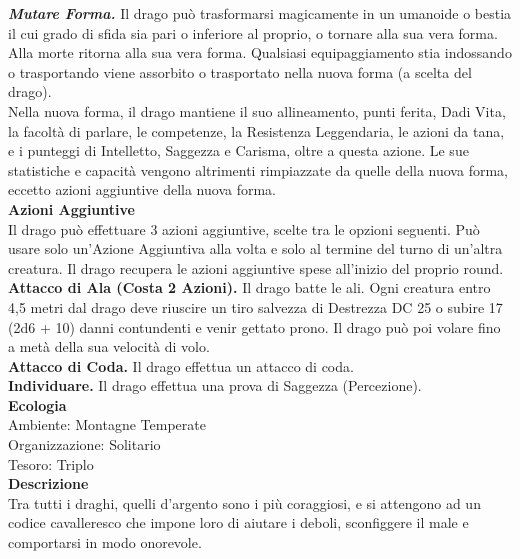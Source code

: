 \begin{multicols}{2}
\emph{\textbf{Mutare Forma.}} Il drago può trasformarsi magicamente in un umanoide o bestia il cui grado di sfida sia pari o inferiore al proprio,  o tornare alla sua vera forma. Alla morte ritorna alla sua vera forma.  Qualsiasi equipaggiamento stia indossando o trasportando viene  assorbito o trasportato nella nuova forma (a scelta del drago).  \\
Nella nuova forma, il drago mantiene il suo allineamento, punti  ferita, Dadi Vita, la facoltà di parlare, le competenze, la Resistenza  Leggendaria, le azioni da tana, e i punteggi di Intelletto, Saggezza  e Carisma, oltre a questa azione. Le sue statistiche e capacità  vengono altrimenti rimpiazzate da quelle della nuova forma, eccetto azioni aggiuntive della nuova forma.\\
\textbf{Azioni Aggiuntive}\\
Il drago può effettuare 3 azioni aggiuntive, scelte tra le opzioni  seguenti. Può usare solo un'Azione Aggiuntiva alla volta e solo  al termine del turno di un'altra creatura. Il drago recupera le azioni aggiuntive spese all'inizio del proprio round.\\
\textbf{Attacco di Ala (Costa 2 Azioni).} Il drago batte le ali. Ogni creatura entro 4,5 metri dal drago deve riuscire un tiro salvezza di Destrezza DC 25 o subire 17 (2d6 + 10) danni contundenti e  venir gettato prono. Il drago può poi volare fino a metà della sua velocità di volo.\\
\textbf{Attacco di Coda.} Il drago effettua un attacco di coda.\\
\textbf{Individuare.} Il drago effettua una prova di Saggezza (Percezione).\\
\textbf{Ecologia}\\
Ambiente: Montagne Temperate\\
Organizzazione: Solitario\\
Tesoro: Triplo\\
\textbf{Descrizione}\\
Tra tutti i draghi, quelli d’argento sono i più coraggiosi, e si attengono ad un codice cavalleresco che impone loro di aiutare i deboli, sconfiggere il male e comportarsi in modo onorevole.\\


\end{multicols}
